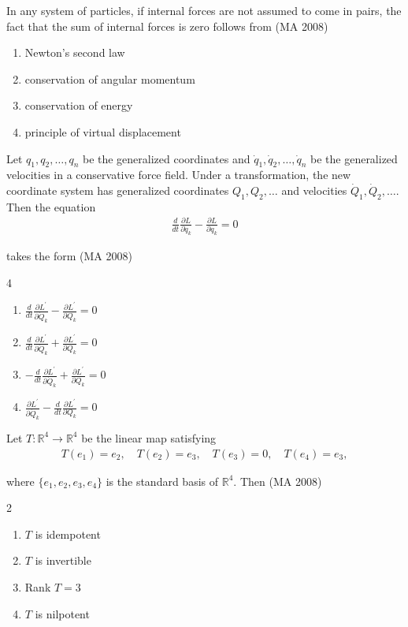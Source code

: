 \item In any system of particles, if internal forces are not assumed to come in pairs, the fact that the sum of internal forces is zero follows from
\hfill (MA 2008)

\begin{enumerate}
\item Newton's second law
\item conservation of angular momentum
\item conservation of energy
\item principle of virtual displacement
\end{enumerate}


\item Let \(q_1, q_2, \ldots, q_n\) be the generalized coordinates and \(\dot{q}_1, \dot{q}_2, \ldots, \dot{q}_n\) be the generalized velocities in a conservative force field. Under a transformation, the new coordinate system has generalized coordinates \(Q_1, Q_2, \ldots\) and velocities \(\dot{Q}_1, \dot{Q}_2, \ldots\). Then the equation
\begin{align}
    \frac{d}{dt}\frac{\partial L}{\partial \dot{q}_k} - \frac{\partial L}{\partial q_k} = 0
\end{align}


takes the form
\hfill (MA 2008)
\begin{multicols}{4}
\begin{enumerate}
\item \(\frac{d}{dt}\frac{\partial L^{\prime}}{\partial \dot{Q}_k} - \frac{\partial L^{\prime}}{\partial Q_k} = 0\)
\item \(\frac{d}{dt}\frac{\partial L^{\prime}}{\partial \dot{Q}_k} + \frac{\partial L^{\prime}}{\partial Q_k} = 0\)
\item \(-\frac{d}{dt}\frac{\partial L^{\prime}}{\partial \dot{Q}_k} + \frac{\partial L^{\prime}}{\partial Q_k} = 0\)
\item \(\frac{\partial L^{\prime}}{\partial \dot{Q}_k} - \frac{d}{dt}\frac{\partial L^{\prime}}{\partial Q_k} = 0\)
\end{enumerate}
\end{multicols}

\item
Let $T:\mathbb{R}^4 \to \mathbb{R}^4$ be the linear map satisfying
\begin{align}
    T(e_1) = e_2,\quad T(e_2) = e_3,\quad T(e_3) = 0,\quad T(e_4) = e_3,
\end{align}


where $\{e_1, e_2, e_3, e_4\}$ is the standard basis of $\mathbb{R}^4$. Then
\hfill (MA 2008)
\begin{multicols}{2}
\begin{enumerate}
\item $T$ is idempotent
\item $T$ is invertible
\item Rank $T = 3$
\item $T$ is nilpotent
\end{enumerate}

\end{multicols}

